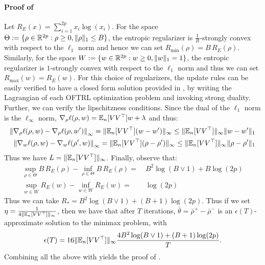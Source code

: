 \paragraph{Proof of } Let $R_E(x)=\sum_{i=1}^{2p} x_i \log(x_i)$. For the space $\Theta:=\{\rho\in \mathbb{R}^{2p}: \rho \geq 0, \|\rho\|_1\leq B\}$, the entropic regularizer is $\frac{1}{B}$-strongly convex with respect to the $\ell_1$ norm and hence we can set $R_{\min}(\rho)=B\, R_{E}(\rho)$. Similarly, for the space $W:=\{w\in \mathbb{R}^{2p}: w\geq 0, \|w\|_1=1\}$, the entropic regularizer is $1$-strongly convex with respect to the $\ell_1$ norm and thus we can set $R_{\max}(w)=R_E(w)$. For this choice of regularizers, the update rules can be easily verified to have a closed form solution provided in , by writing the Lagrangian of each OFTRL optimization problem and invoking strong duality. Further, we can verify the lipschitzness conditions. Since the dual of the $\ell_1$ norm is the $\ell_{\infty}$ norm,  $\nabla_{\rho}\ell(\rho, w) = \mathbb{E}_n[VV^\top] w + \lambda$ and thus:
\begin{align}
    \left\|\nabla_{\rho}\ell(\rho, w) - \nabla_{\rho}\ell(\rho, w')\right\|_{\infty} =\|\mathbb{E}_n[VV^\top] (w-w')\|_{\infty} \leq \|\mathbb{E}_n[VV^\top]\|_{\infty} \|w-w'\|_1\\
    \left\|\nabla_{w}\ell(\rho, w) - \nabla_{w}\ell(\rho', w)\right\|_{\infty} =\|\mathbb{E}_n[VV^\top] (\rho-\rho')\|_{\infty} \leq \|\mathbb{E}_n[VV^\top]\|_{\infty} \|\rho-\rho'\|_1\\
\end{align}
Thus we have $L=\|\mathbb{E}_n[VV^\top]\|_{\infty}$. Finally, observe that:
\begin{align}
    \sup_{\rho\in \Theta} B\, R_{E}(\rho) - \inf_{\rho\in \Theta} B\, R_E(\rho) =~& B^2 \log(B\vee 1) + B \log(2p)\\
    \sup_{w\in W} R_{E}(w) - \inf_{w\in W} R_E(w) =~& \log(2p)
\end{align}
Thus we can take $R_*=B^2 \log(B\vee 1) + (B+1) \log(2p)$. Thus if we set $\eta = \frac{1}{4\|\mathbb{E}_n[VV^\top]\|_{\infty}}$, then we have that after $T$ iterations, $\bar{\theta}=\bar{\rho}^+-\bar{\rho}^-$ is an $\epsilon(T)$-approximate solution to the minimax problem, with \begin{equation}
\epsilon(T)=16\|\mathbb{E}_n[VV^\top]\|_{\infty} \frac{4B^2 \log(B\vee 1) + (B+1) \log(2p)}{T}.
\end{equation}
Combining all the above with  yields the proof of .



